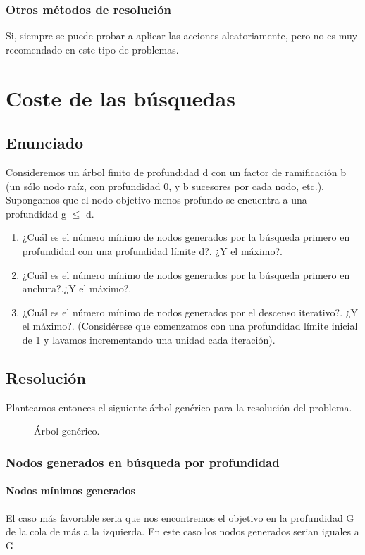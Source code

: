 \documentclass[a4paper,10pt]{article}
\begin{document}
\subsubsection{Otros métodos de resolución}
Si, siempre se puede probar a aplicar las acciones aleatoriamente, pero no es muy recomendado en este tipo de problemas.


\pagebreak



\section{Coste de las búsquedas}
\subsection{Enunciado}
Consideremos un árbol finito de profundidad d con un factor de ramificación b (un sólo nodo raíz, con profundidad 0, y b sucesores por cada nodo, etc.). Supongamos que el nodo objetivo menos profundo se encuentra a una profundidad g $\leq$ d.
\begin{enumerate}
  \item ¿Cuál es el número mínimo de nodos generados por la búsqueda primero en profundidad con una profundidad límite d?. ¿Y el máximo?.
  \item ¿Cuál es el número mínimo de nodos generados por la búsqueda primero en anchura?.¿Y el máximo?.
  \item ¿Cuál es el número mínimo de nodos generados por el descenso iterativo?. ¿Y el máximo?. (Considérese que comenzamos con una profundidad límite inicial de 1 y lavamos incrementando una unidad cada iteración).
\end{enumerate}
\subsection{Resolución}
Planteamos entonces el siguiente árbol genérico para la resolución del problema.
\begin{figure}[hbt]
  \centering
	\scalebox{0.7}{}
	\caption{Árbol genérico.}
	\label{fig:generic_tree}
\end{figure}
\pagebreak
\subsubsection{Nodos generados en búsqueda por profundidad}
\paragraph{Nodos mínimos generados}
El caso más favorable seria que nos encontremos el objetivo en la profundidad G de la cola de más a la izquierda. En este caso los nodos  generados serian iguales a G
\end{document}
